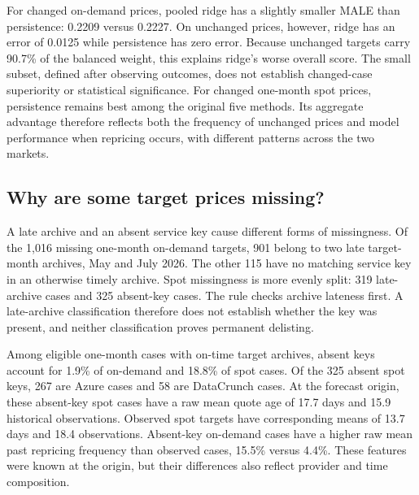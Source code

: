 \documentclass[10pt]{article}
\begin{document}
For changed on-demand prices, pooled ridge has a slightly smaller MALE than persistence: 0.2209 versus 0.2227. On unchanged prices, however, ridge has an error of 0.0125 while persistence has zero error. Because unchanged targets carry 90.7\% of the balanced weight, this explains ridge's worse overall score. The small subset, defined after observing outcomes, does not establish changed-case superiority or statistical significance. For changed one-month spot prices, persistence remains best among the original five methods. Its aggregate advantage therefore reflects both the frequency of unchanged prices and model performance when repricing occurs, with different patterns across the two markets.

\subsection{Why are some target prices missing?}

A late archive and an absent service key cause different forms of missingness. Of the 1,016 missing one-month on-demand targets, 901 belong to two late target-month archives, May and July 2026. The other 115 have no matching service key in an otherwise timely archive. Spot missingness is more evenly split: 319 late-archive cases and 325 absent-key cases. The rule checks archive lateness first. A late-archive classification therefore does not establish whether the key was present, and neither classification proves permanent delisting.

\begin{table}[H]
\centering\small

\caption{Sources of missing targets among eligible cases, counted as raw rows. The last column divides absent-key cases by eligible cases after excluding late archives. It measures absence conditional on an on-time archive and does not correct selection bias. Shared archive delays and overlapping forecast horizons mean that rows are not independent failures.}
\label{tab:table8}
\end{table}

Among eligible one-month cases with on-time target archives, absent keys account for 1.9\% of on-demand and 18.8\% of spot cases. Of the 325 absent spot keys, 267 are Azure cases and 58 are DataCrunch cases. At the forecast origin, these absent-key spot cases have a raw mean quote age of 17.7 days and 15.9 historical observations. Observed spot targets have corresponding means of 13.7 days and 18.4 observations. Absent-key on-demand cases have a higher raw mean past repricing frequency than observed cases, 15.5\% versus 4.4\%. These features were known at the origin, but their differences also reflect provider and time composition.
\end{document}

